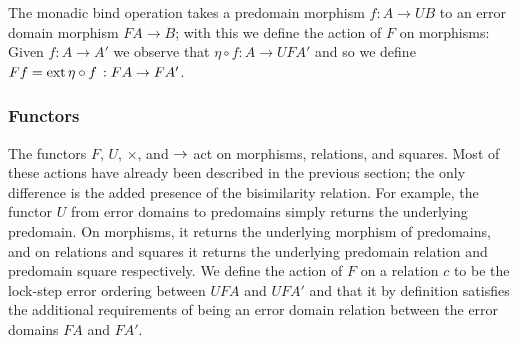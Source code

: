The monadic bind operation takes a predomain morphism $f : A \to UB$ to an error
domain morphism $FA \to B$; with this we define the action of $F$ on morphisms:
Given $f : A \to A'$ we observe that $\eta \circ f : A \to UFA'$ and so we define
$Ff = \text{ext}\,{\eta \circ f}\,{} : FA \to FA'$.



 







\subsubsection{Functors}

The functors $F$, $U$, $\times$, and $\to$ act on morphisms, relations, and
squares. Most of these actions have already been described in the previous
section; the only difference is the added presence of the bisimilarity relation.
For example, the functor $U$ from error domains to predomains simply returns the
underlying predomain. On morphisms, it returns the underlying morphism of
predomains, and on relations and squares it returns the underlying predomain
relation and predomain square respectively. We define the action of $F$ on a
relation $c$ to be the lock-step error ordering between $UFA$ and $UFA'$ and
that it by definition satisfies the additional requirements of being an error
domain relation between the error domains $FA$ and $FA'$.

